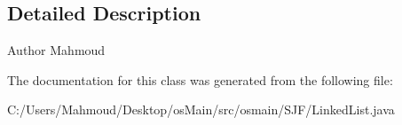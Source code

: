 \subsection{Detailed Description}
\begin{DoxyAuthor}{Author}
Mahmoud 
\end{DoxyAuthor}


The documentation for this class was generated from the following file\+:\begin{DoxyCompactItemize}
\item 
C\+:/\+Users/\+Mahmoud/\+Desktop/os\+Main/src/osmain/\+S\+J\+F/Linked\+List.\+java\end{DoxyCompactItemize}
